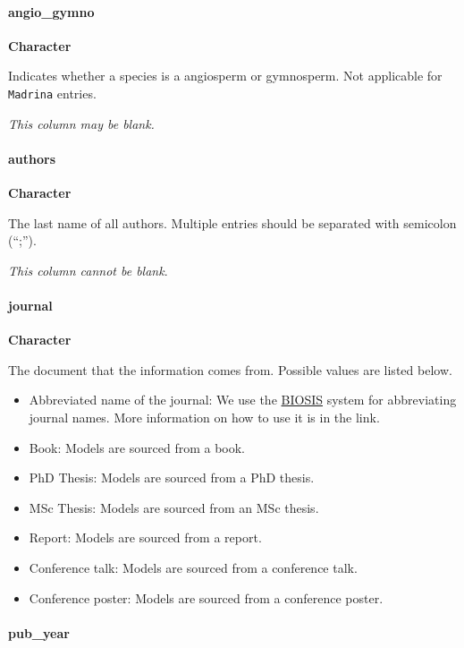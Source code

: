 \documentclass[]{article}
\let\oldparagraph\paragraph
\renewcommand{\paragraph}[1]{\oldparagraph{#1}\mbox{}}
\begin{document}
\paragraph{angio\_gymno}\label{angio_gymno}

\textbf{Character}

Indicates whether a species is a angiosperm or gymnosperm. Not
applicable for \texttt{Madrina} entries.

\emph{This column may be blank.}

\paragraph{authors}\label{authors}

\textbf{Character}

The last name of all authors. Multiple entries should be separated with
semicolon (``;'').

\emph{This column cannot be blank}.

\paragraph{journal}\label{journal}

\textbf{Character}

The document that the information comes from. Possible values are listed
below.

\begin{itemize}
\item
  Abbreviated name of the journal: We use the
  \href{http://cms.library.illinois.edu/export/biotech/j-abbrev.html}{BIOSIS}
  system for abbreviating journal names. More information on how to use
  it is in the link.
\item
  Book: Models are sourced from a book.
\item
  PhD Thesis: Models are sourced from a PhD thesis.
\item
  MSc Thesis: Models are sourced from an MSc thesis.
\item
  Report: Models are sourced from a report.
\item
  Conference talk: Models are sourced from a conference talk.
\item
  Conference poster: Models are sourced from a conference poster.
\end{itemize}

\paragraph{pub\_year}\label{pub_year}
\end{document}
